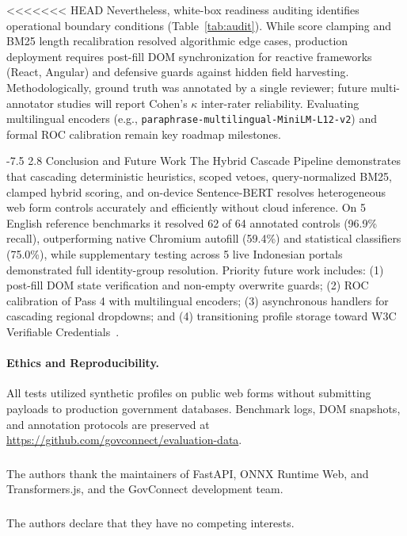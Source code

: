 \documentclass[runningheads,a4paper]{llncs}
\makeatletter
\renewcommand\section{\@startsection{section}{1}{\z@}%
  {-7.5\p@ \@plus -2\p@ \@minus -1\p@}%
  {2.8\p@ \@plus 1\p@}%
  {\normalfont\large\bfseries}}
\makeatother
\begin{document}
<<<<<<< HEAD
Nevertheless, white-box readiness auditing identifies operational boundary conditions (Table~\ref{tab:audit}). While score clamping and BM25 length recalibration resolved algorithmic edge cases, production deployment requires post-fill DOM synchronization for reactive frameworks (React, Angular) and defensive guards against hidden field harvesting. Methodologically, ground truth was annotated by a single reviewer; future multi-annotator studies will report Cohen's $\kappa$ inter-rater reliability. Evaluating multilingual encoders (e.g., \texttt{paraphrase-multilingual-MiniLM-L12-v2}) and formal ROC calibration remain key roadmap milestones.

\section{Conclusion and Future Work}
The Hybrid Cascade Pipeline demonstrates that cascading deterministic heuristics, scoped vetoes, query-normalized BM25, clamped hybrid scoring, and on-device Sentence-BERT resolves heterogeneous web form controls accurately and efficiently without cloud inference. On 5 English reference benchmarks it resolved 62 of 64 annotated controls (96.9\% recall), outperforming native Chromium autofill (59.4\%) and statistical classifiers (75.0\%), while supplementary testing across 5 live Indonesian portals demonstrated full identity-group resolution. Priority future work includes: (1) post-fill DOM state verification and non-empty overwrite guards; (2) ROC calibration of Pass 4 with multilingual encoders; (3) asynchronous handlers for cascading regional dropdowns; and (4) transitioning profile storage toward W3C Verifiable Credentials~\cite{vc}.

\paragraph{Ethics and Reproducibility.}
All tests utilized synthetic profiles on public web forms without submitting payloads to production government databases. Benchmark logs, DOM snapshots, and annotation protocols are preserved at \url{https://github.com/govconnect/evaluation-data}.

\begin{credits}
\subsubsection{\ackname}
The authors thank the maintainers of FastAPI, ONNX Runtime Web, and Transformers.js, and the GovConnect development team.

\subsubsection{\discintname}
The authors declare that they have no competing interests.
\end{credits}
\end{document}
